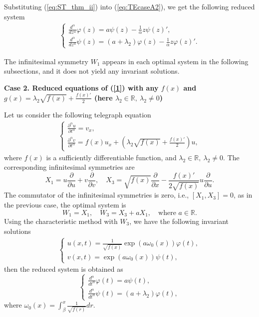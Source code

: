 \documentclass[12pt]{amsart}
\begin{document}
Substituting (\ref{eq:ST_thm_ii}) into (\ref{eq:TEcaseA2}), we get the following reduced system
\begin{eqnarray}
\label{eq:RS_thm_ii}
\begin{cases}
\frac{d^\alpha}{dz^\alpha}\varphi(z)=a\psi(z)-\frac{1}{\alpha}z\psi(z)',\\
\frac{d^\alpha}{dz^\alpha}\psi(z)=(a+\lambda_2)\varphi(z)-\frac{1}{\alpha}z\varphi(z)'.
\end{cases}
\end{eqnarray}

The infinitesimal symmetry $W_1$ appears in each optimal system in the following subsections, and it does not yield any invariant solutions.

\textbf{Case 2. Reduced equations of (\ref{1}) with any $f(x)$ and $g(x)=\lambda_2 \sqrt{f(x)}+\frac{f(x)'}{2}$ (here $\lambda_2\in \mathbb{R},~ \lambda_2\ne 0$)} 

Let us consider the following telegraph equation
\begin{eqnarray}
\label{eq:TEcaseA3}
\begin{cases}
\frac{\partial^\alpha u}{\partial t^\alpha}=v_x,\\
\frac{\partial^\alpha v}{\partial t^\alpha}=f(x) u_x+
\left (\lambda_2\sqrt{f(x)}+\frac{f(x)'}{2}\right)u,
\end{cases}
\end{eqnarray}
where $f(x)$ is a  sufficiently differentiable function, and $\lambda_2\in \mathbb{R},~ \lambda_2\ne 0$. The corresponding infinitesimal symmetries are 
$$X_1=u\frac{\partial}{\partial u}+v\frac{\partial}{\partial v},\quad   X_3=\sqrt{f(x)}\frac{\partial}{\partial x}-\frac{f(x)'}{2\sqrt{f(x)}}u\frac{\partial}{\partial u}.$$
The commutator of the infinitesimal symmetries is zero, i.e., $[X_1,X_3] = 0$, as in the previous case, the optimal system is
$$W_1=X_1,\quad
W_3=X_3+aX_1,\quad\text{where } a\in \mathbb{R}.
$$
Using the characteristic method with $W_3$, we have the following invariant solutions
\begin{eqnarray}
\label{eq:ST_thm_iii}
\begin{cases}
u(x,t)=\frac{1}{\sqrt{f(x)}}\exp\left(a\omega_{0}(x)\right)\varphi(t),\\
v(x,t)=\exp\left(a\omega_{0}(x)\right)\psi(t),
\end{cases}
\end{eqnarray}
then the reduced system is obtained as
\begin{equation}
\label{eq:RS_thm_iii}
    \begin{cases}
    \frac{d^\alpha }{dt^\alpha}\varphi(t)=a\psi(t),\\
    \frac{d^\alpha }{dt^\alpha}\psi(t)=(a+\lambda_2)\varphi(t),
    \end{cases}
\end{equation}
where $\omega_{0}(x)=\int^x_{\beta} \frac{1}{\sqrt{f(r)}}dr$.
\end{document}
